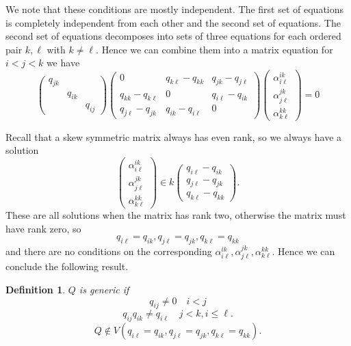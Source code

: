 \documentclass{article}
\newtheorem{definition}{Definition}
\begin{document}
We note that these conditions are mostly independent.  The first set of equations is completely independent from each other and the second set of equations.
The second set of equations decomposes into sets of three equations
for each ordered pair $k,\ell$ with $k \neq \ell.$
Hence we can combine them into a matrix equation for $i<j<k$ we have
$$\begin{pmatrix}
  q_{jk} & & \\
    & q_{ik} & \\
    & & q_{ij}
\end{pmatrix}
\begin{pmatrix}
  0 & q_{k \ell}-q_{kk} & q_{jk} - q_{j\ell} \\
  q_{kk} - q_{k \ell} & 0 & q_{i\ell} - q_{ik} \\
  q_{j\ell} - q_{jk} & q_{ik} - q_{i\ell} & 0
\end{pmatrix}
\begin{pmatrix}
  \alpha^{ik}_{i\ell} \\ \alpha^{jk}_{j\ell} \\  \alpha^{kk}_{k\ell}
  \end{pmatrix} = 0
$$

Recall that a skew symmetric matrix always has even rank, so we always have a solution
$$\begin{pmatrix}
  \alpha^{ik}_{i\ell} \\ \alpha^{jk}_{j\ell} \\  \alpha^{kk}_{k\ell}
\end{pmatrix}
\in k
\begin{pmatrix}
  q_{i\ell} - q_{ik} \\ q_{j\ell} - q_{jk} \\ q_{k\ell} - q_{kk}
\end{pmatrix}.$$
These are all solutions when the matrix has rank two, otherwise the matrix must have rank zero, so $$ q_{i\ell} = q_{ik},q_{j\ell} = q_{jk}, q_{k\ell} = q_{kk}$$
and there are no conditions on the corresponding  $\alpha^{ik}_{i\ell},\alpha^{jk}_{j\ell},\alpha^{kk}_{k\ell}.$  Hence we can conclude the following result.

\begin{definition}
  $Q$ is {\it generic} if 
  $$q_{ij} \neq 0 \quad i<j$$
  $$q_{ij}q_{ik} \neq q_{i\ell} \quad j<k, i \leq \ell.$$
  $$ Q \notin V(q_{i\ell} = q_{ik},q_{j\ell} = q_{jk}, q_{k\ell} = q_{kk}).$$
\end{definition}
\end{document}

